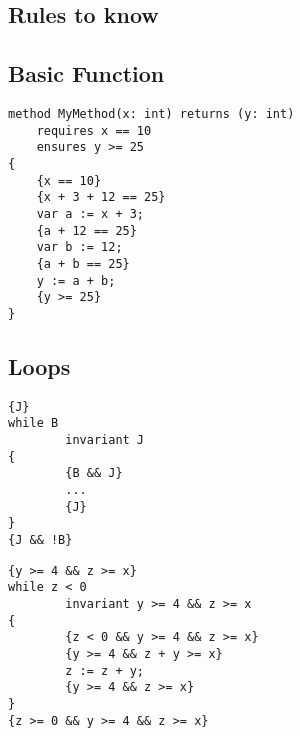 \subsection{Rules to know}

\subsection{Basic Function} 
\begin{verbatim}
method MyMethod(x: int) returns (y: int)
    requires x == 10
    ensures y >= 25
{
    {x == 10}
    {x + 3 + 12 == 25}
    var a := x + 3;
    {a + 12 == 25}
    var b := 12;
    {a + b == 25}
    y := a + b;
    {y >= 25}
}

\end{verbatim}


\subsection{Loops} 
\begin{multicols}{2}
\begin{verbatim}
{J}
while B
        invariant J
{
        {B && J}
        ... 
        {J}
}
{J && !B}
\end{verbatim}

\columnbreak
\begin{tiny}
\begin{verbatim}
{y >= 4 && z >= x}
while z < 0
        invariant y >= 4 && z >= x
{
        {z < 0 && y >= 4 && z >= x}
        {y >= 4 && z + y >= x}
        z := z + y;
        {y >= 4 && z >= x}
}
{z >= 0 && y >= 4 && z >= x}
\end{verbatim}
\end{tiny}
\end{multicols}


